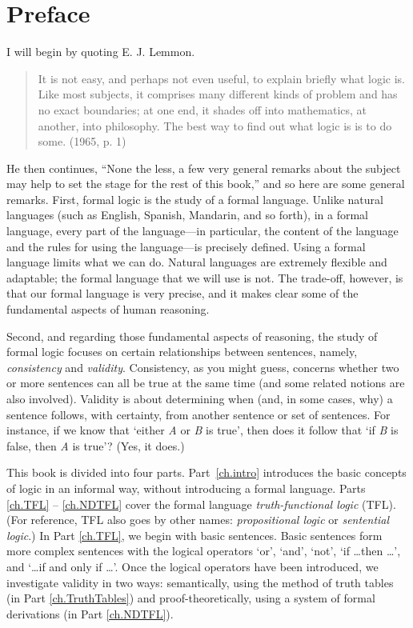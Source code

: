 \chapter{Preface}

I will begin by quoting E. J. Lemmon.
\begin{quote}
It is not easy, and perhaps not even useful, to explain briefly what logic is. Like most subjects, it comprises many different kinds of problem and has no exact boundaries; at one end, it shades off into mathematics, at another, into philosophy. The best way to find out what logic is is to do some. (1965, p. 1)
\end{quote}
He then continues, ``None the less, a few very general remarks about the subject may help to set the stage for the rest of this book,'' and so here are some general remarks. First, formal logic is the study of a formal language. Unlike natural languages (such as English, Spanish, Mandarin, and so forth), in a formal language, every part of the language—in particular, the content of the language and the rules for using the language—is precisely defined. Using a formal language limits what we can do. Natural languages are extremely flexible and adaptable; the formal language that we will use is not. The trade-off, however, is that our formal language is very precise, and it makes clear some of the fundamental aspects of human reasoning.

Second, and regarding those fundamental aspects of reasoning, the study of formal logic focuses on certain relationships between sentences, namely, \textit{consistency} and \textit{validity}. Consistency, as you might guess, concerns whether two or more sentences can all be  true at the same time (and some related notions  are also involved). Validity is about determining when (and, in some cases, why) a sentence follows, with certainty, from another sentence or set of sentences. For instance, if we know that `either \textit{A} or \textit{B} is true', then does it follow that `if \textit{B} is false, then \textit{A} is true'? (Yes, it  does.) 
\bigskip

\noindent This book is divided into four parts. Part~\ref{ch.intro} introduces the basic concepts of logic in an informal way, without introducing a formal language. Parts \ref{ch.TFL} -- \ref{ch.NDTFL} cover the formal language \textit{truth-functional logic} (TFL). (For reference, TFL also goes by other names: \textit{propositional logic} or \textit{sentential logic}.) In Part \ref{ch.TFL}, we begin with basic sentences. Basic sentences form more complex sentences with the logical operators ‘or’, ‘and’, ‘not’, ‘if \ldots then \ldots’, and `\ldots if and only if \ldots'. Once the logical operators have been introduced, we investigate validity in two ways: semantically, using the method of truth tables (in Part \ref{ch.TruthTables}) and proof-theoretically, using a system of formal derivations (in Part \ref{ch.NDTFL}). 

